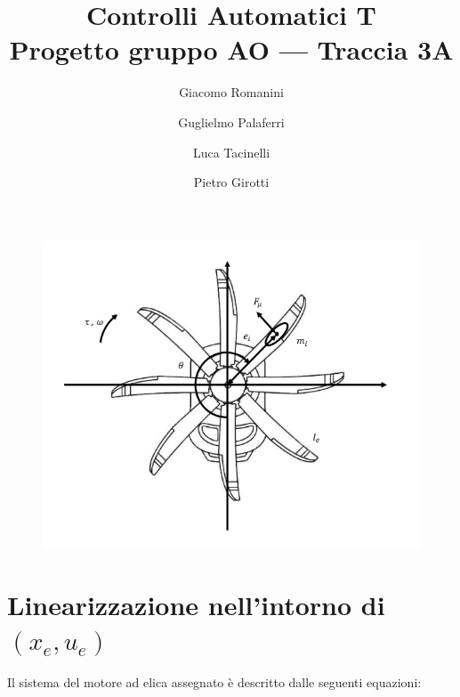 \documentclass[a4paper,12pt,italian]{article}
\title{
    Controlli Automatici T \\
    \large Progetto gruppo AO --- Traccia 3A\\
}
\author{
    Giacomo Romanini\\
    \and
    Guglielmo Palaferri\\
    \and
    Luca Tacinelli\\
    \and
    Pietro Girotti\\
}
\begin{document}
\maketitle

\begin{figure}[h]
    \begin{center}
        \includegraphics[scale=0.5]{img/elica.png}
    \end{center}    
\end{figure}


\section{Linearizzazione nell'intorno di $(x_e, u_e)$}
Il sistema del motore ad elica assegnato è descritto dalle seguenti equazioni: 
\end{document}
